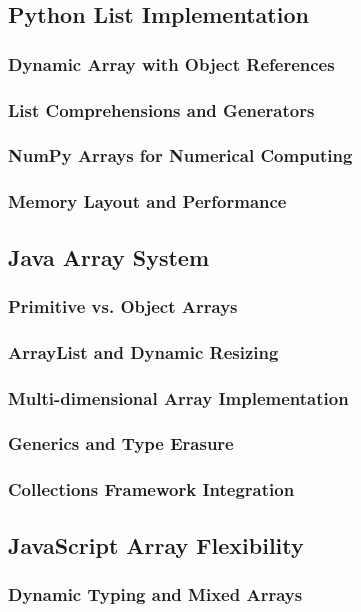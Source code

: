\documentclass[12pt, oneside]{book}
\begin{document}
\subsection{Python List Implementation}
\subsubsection{Dynamic Array with Object References}
\subsubsection{List Comprehensions and Generators}
\subsubsection{NumPy Arrays for Numerical Computing}
\subsubsection{Memory Layout and Performance}

\subsection{Java Array System}
\subsubsection{Primitive vs. Object Arrays}
\subsubsection{ArrayList and Dynamic Resizing}
\subsubsection{Multi-dimensional Array Implementation}
\subsubsection{Generics and Type Erasure}
\subsubsection{Collections Framework Integration}

\subsection{JavaScript Array Flexibility}
\subsubsection{Dynamic Typing and Mixed Arrays}
\end{document}
